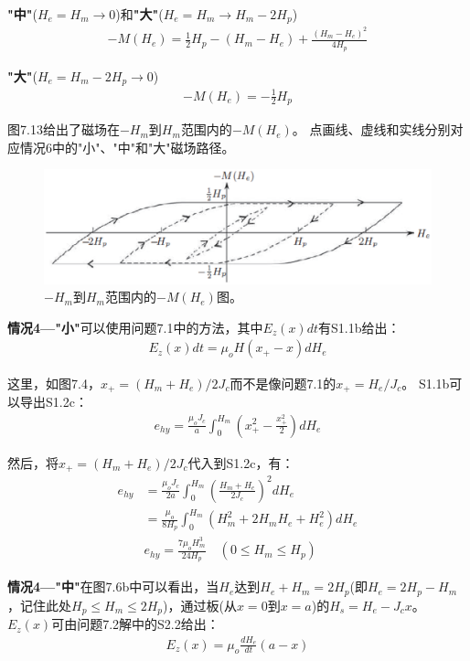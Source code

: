 \textbf{"中"}($H_e=H_m\rightarrow 0$)和\textbf{"大"}($H_e=H_m\rightarrow H_m-2H_p$)
\begin{align*}%
-M(H_e)=\frac{1}{2}H_p-(H_m-H_e)+\frac{(H_m-H_e)^2}{4H_p} \tag{5.7a}
\end{align*}

\textbf{"大"}($H_e=H_m-2H_p\rightarrow 0$)
\begin{align*}%
-M(H_e)=-\frac{1}{2}H_p
\end{align*}

图7.13给出了磁场在$-H_m$到$H_m$范围内的$-M(H_e)$。
点画线、虚线和实线分别对应情况6中的"小"、"中"和"大"磁场路径。
\begin{figure}[htbp]
	\centering
	\includegraphics[scale=0.7]{chpt7/figs/fig7.13.eps}
	\caption{$-H_m$到$H_m$范围内的$-M(H_e)$图。}
\end{figure}

\textbf{情况4---"小"}\quad 可以使用问题7.1中的方法，其中$E_z(x)dt$有S1.1b给出：
\begin{align*}%
E_z(x)dt=\mu_oH(x_+-x)dH_e \tag{S1.1b}
\end{align*}

这里，如图7.4，$x_+=(H_m+H_e)/2J_c$而不是像问题7.1的$x_+=H_e/J_c$。
S1.1b可以导出S1.2c：
\begin{align*}%
e_{hy}=\frac{\mu_oJ_c}{a}\int_{0}^{H_m}\left(x_{+}^{2}-\frac{x_{+}^{2}}{2}\right)dH_e \tag{S1.2c}
\end{align*}

然后，将$x_+=(H_m+H_e)/2J_c$代入到S1.2c，有：
\begin{align*}%
e_{hy}&=\frac{\mu_oJ_c}{2a}\int_{0}^{H_m}\left(\frac{H_m+H_e}{2J_c}\right)^2dH_e \\
&=\frac{\mu_o}{8H_p}\int_{0}^{H_m}(H_{m}^{2}+2H_mH_e+H_{e}^{2})dH_e\\
&e_{hy}=\frac{7\mu_oH_{m}^{3}}{24H_p} \quad(0\le H_m\le H_p) \tag{7.19a}
\end{align*}

\textbf{情况4---"中"}\quad 在图7.6b中可以看出，当$H_e$达到$H_e+H_m=2H_p$(即$H_e=2H_p-H_m$，记住此处$H_p\le H_m\le 2H_p$)，通过板(从$x=0$到$x=a$)的$H_s=H_e-J_c x$。$E_z(x)$可由问题7.2解中的S2.2给出：
\begin{align*}%
E_z(x)=\mu_o\frac{dH_e}{dt}(a-x) \tag{S2.2}
\end{align*}


